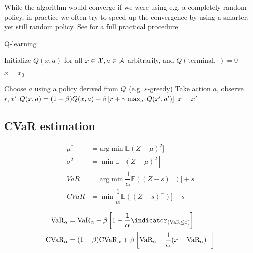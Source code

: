 While the algorithm would converge if we were using e.g. a completely random policy, in practice we often try to speed up the convergence by using a smarter, yet still random policy. See  for a full practical procedure.


\begin{algorithm}[h!]
\caption{Q-learning}
\begin{algorithmic}\label{alg:qlearning}
    \STATE Initialize $Q(x, a)$ for all $x \in \mathcal{X}, a \in \mathcal{A}$ arbitrarily, and $Q(\text{terminal}, \cdot) = 0$
    
		
	\STATE $x = x_0$
	
	\STATE Choose $a$ using a policy derived from $Q$ (e.g. $\varepsilon$-greedy)
	\STATE Take action $a$, observe $r, x'$
	\STATE $Q(x, a) = (1-\beta)Q(x, a) + \beta\left[ {r + \gamma \max_{a'} Q(x', a')} \right]$
	\STATE $x = x'$	
	\ENDWHILE
	
	\ENDFOR
\end{algorithmic}
\end{algorithm}

\subsection{CVaR estimation}\label{sec:cvarestimation}
\begin{align*}
\mu^* &= \text{arg}\min \mathbb{E}(Z-\mu)^2]\\
\sigma^2 &= \min \mathbb{E}[(Z-\mu)^2]\\
VaR &= \text{arg}\min \dfrac{1}{\alpha}\mathbb{E}((Z-s)^-)] + s\\
CVaR &= \min \dfrac{1}{\alpha}\mathbb{E}((Z-s)^-)] + s
\end{align*}

\begin{align*}
\var_\alpha &= \var_\alpha - \beta \bsquare{1-\dfrac{1}{\alpha}\indicator_{(\var \le x)}}\\
\cvar_\alpha &= (1-\beta)\cvar_\alpha + \beta \bsquare{\var_\alpha + \dfrac{1}{\alpha}(x-\var_\alpha)^-}
\end{align*}



